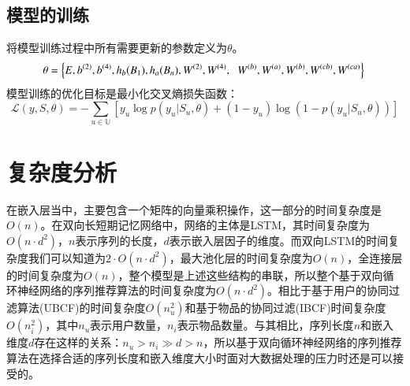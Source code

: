 \subsection{模型的训练}
将模型训练过程中所有需要更新的参数定义为$\theta $。
\begin{equation}
\theta=  \left \{ E,b^{(2)},b^{(4)},h_{b}(B_{1}),h_{a}(B_{n}),W^{(2)}, W^{(4)},\right.\\
\left.W^{(b)},W^{(a)},W^{(b)},W^{(cb)},W^{(ca)} \right \} \\
\end{equation}
模型训练的优化目标是最小化交叉熵损失函数：
\begin{equation}
\mathcal{L}(y,S,\theta )=-\sum_{u\in \mathbb{U}}[y_{u}\log p(y_{u}|S_{u},\theta)+(1-y_{u})\log (1-p(y_{u}|S_{u},\theta ))]
\end{equation}
\section{复杂度分析}
在嵌入层当中，主要包含一个矩阵的向量乘积操作，这一部分的时间复杂度是$O(n)$。在双向长短期记忆网络中，网络的主体是LSTM，其时间复杂度为$O(n\cdot d^{2})$，$n$表示序列的长度，$d$表示嵌入层因子的维度。而双向LSTM的时间复杂度我们可以知道为$2\cdot O(n\cdot d^{2})$，最大池化层的时间复杂度为$O(n)$，全连接层的时间复杂度为$O(n)$，整个模型是上述这些结构的串联，所以整个基于双向循环神经网络的序列推荐算法的时间复杂度为$O(n\cdot d^{2})$。相比于基于用户的协同过滤算法(UBCF)的时间复杂度$O(n_{u}^{2})$和基于物品的协同过滤(IBCF)时间复杂度$O(n_{i}^{2})$，其中$n_{u}$表示用户数量，$n_{i}$表示物品数量。与其相比，序列长度$n$和嵌入维度$d$存在这样的关系：$n_{u}> n_{i}\gg d> n$，所以基于双向循环神经网络的序列推荐算法在选择合适的序列长度和嵌入维度大小时面对大数据处理的压力时还是可以接受的。
